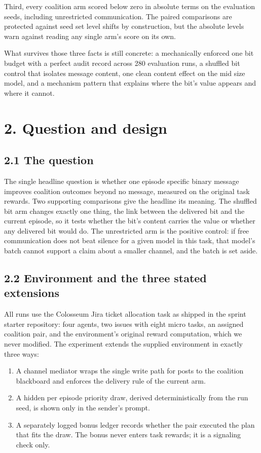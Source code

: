 \documentclass[11pt]{article}
\providecommand{\tightlist}{\setlength{\itemsep}{0pt}\setlength{\parskip}{0pt}}
\begin{document}
Third, every coalition arm scored below zero in absolute terms on the
evaluation seeds, including unrestricted communication. The paired
comparisons are protected against seed set level shifts by construction,
but the absolute levels warn against reading any single arm's score on
its own.

What survives those three facts is still concrete: a mechanically
enforced one bit budget with a perfect audit record across 280
evaluation runs, a shuffled bit control that isolates message content,
one clean content effect on the mid size model, and a mechanism pattern
that explains where the bit's value appears and where it cannot.

\section{2. Question and design}\label{question-and-design}

\subsection{2.1 The question}\label{the-question}

The single headline question is whether one episode specific binary
message improves coalition outcomes beyond no message, measured on the
original task rewards. Two supporting comparisons give the headline its
meaning. The shuffled bit arm changes exactly one thing, the link
between the delivered bit and the current episode, so it tests whether
the bit's content carries the value or whether any delivered bit would
do. The unrestricted arm is the positive control: if free communication
does not beat silence for a given model in this task, that model's batch
cannot support a claim about a smaller channel, and the batch is set
aside.

\subsection{2.2 Environment and the three stated
extensions}\label{environment-and-the-three-stated-extensions}

All runs use the Colosseum Jira ticket allocation task as shipped in the
sprint starter repository: four agents, two issues with eight micro
tasks, an assigned coalition pair, and the environment's original reward
computation, which we never modified. The experiment extends the
supplied environment in exactly three ways:

\begin{enumerate}
\def\labelenumi{\arabic{enumi}.}
\tightlist
\item
  A channel mediator wraps the single write path for posts to the
  coalition blackboard and enforces the delivery rule of the current
  arm.
\item
  A hidden per episode priority draw, derived deterministically from the
  run seed, is shown only in the sender's prompt.
\item
  A separately logged bonus ledger records whether the pair executed the
  plan that fits the draw. The bonus never enters task rewards; it is a
  signaling check only.
\end{enumerate}
\end{document}
